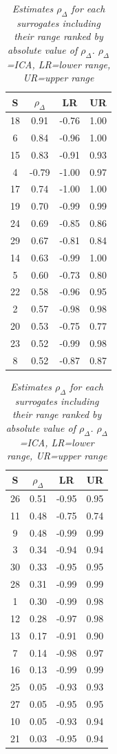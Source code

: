 \documentclass[a4paper,12pt]{article}
\begin{document}
	\begin{table}[H]
		\centering
		\begin{tabular}{cccc}
			\hline
			S & $\rho_{\Delta}$ & LR & UR \\ 
			\hline
			18 & 0.91 & -0.76 & 1.00 \\ 
			6 & 0.84 & -0.96 & 1.00 \\ 
			15 & 0.83 & -0.91 & 0.93 \\ 
			4 & -0.79 & -1.00 & 0.97 \\ 
			17 & 0.74 & -1.00 & 1.00 \\ 
			19 & 0.70 & -0.99 & 0.99 \\ 
			24 & 0.69 & -0.85 & 0.86 \\ 
			29 & 0.67 & -0.81 & 0.84 \\ 
			14 & 0.63 & -0.99 & 1.00 \\ 
			5 & 0.60 & -0.73 & 0.80 \\ 
			22 & 0.58 & -0.96 & 0.95 \\ 
			2 & 0.57 & -0.98 & 0.98 \\ 
			20 & 0.53 & -0.75 & 0.77 \\ 
			23 & 0.52 & -0.99 & 0.98 \\ 
			8 & 0.52 & -0.87 & 0.87 \\
			\hline
		\end{tabular}
		\quad
		\begin{tabular}{cccc}
			\hline
			S & $\rho_{\Delta}$ & LR & UR \\ 
			\hline
			26 & 0.51 & -0.95 & 0.95 \\ 
			11 & 0.48 & -0.75 & 0.74 \\ 
			9 & 0.48 & -0.99 & 0.99 \\ 
			3 & 0.34 & -0.94 & 0.94 \\ 
			30 & 0.33 & -0.95 & 0.95 \\ 
			28 & 0.31 & -0.99 & 0.99 \\ 
			1 & 0.30 & -0.99 & 0.98 \\ 
			12 & 0.28 & -0.97 & 0.98 \\ 
			13 & 0.17 & -0.91 & 0.90 \\ 
			7 & 0.14 & -0.98 & 0.97 \\ 
			16 & 0.13 & -0.99 & 0.99 \\ 
			25 & 0.05 & -0.93 & 0.93 \\ 
			27 & 0.05 & -0.95 & 0.95 \\ 
			10 & 0.05 & -0.93 & 0.94 \\ 
			21 & 0.03 & -0.95 & 0.94 \\ 
			\hline
		\end{tabular}
		\caption{\emph{Estimates $\rho_{\Delta}$ for each surrogates including their range ranked by absolute value of $\rho_{\Delta}$. $\rho_{\Delta}$=ICA, LR=lower range, UR=upper range}}\label{ica}
	\end{table}
	
\end{document}
